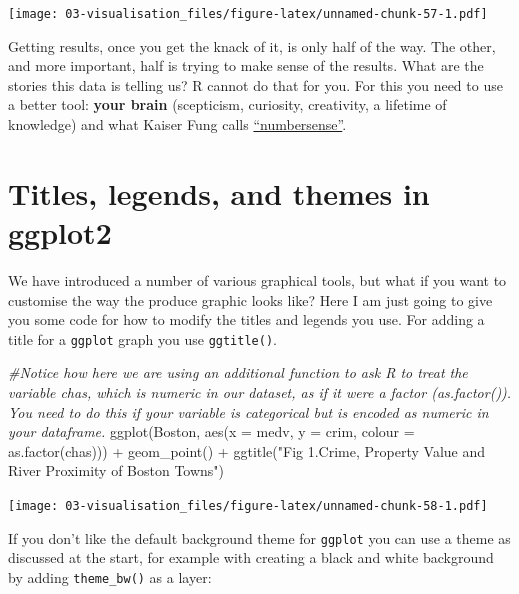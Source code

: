 \documentclass[
]{book}
\newenvironment{Shaded}{\begin{snugshade}}{\end{snugshade}}
\newcommand{\AttributeTok}[1]{\textcolor[rgb]{0.77,0.63,0.00}{#1}}
\newcommand{\CommentTok}[1]{\textcolor[rgb]{0.56,0.35,0.01}{\textit{#1}}}
\newcommand{\FunctionTok}[1]{\textcolor[rgb]{0.00,0.00,0.00}{#1}}
\newcommand{\NormalTok}[1]{#1}
\newcommand{\SpecialCharTok}[1]{\textcolor[rgb]{0.00,0.00,0.00}{#1}}
\newcommand{\StringTok}[1]{\textcolor[rgb]{0.31,0.60,0.02}{#1}}
\begin{document}
\texttt{[image: 03-visualisation\_files/figure-latex/unnamed-chunk-57-1.pdf]}

Getting results, once you get the knack of it, is only half of the way. The other, and more important, half is trying to make sense of the results. What are the stories this data is telling us? R cannot do that for you. For this you need to use a better tool: \textbf{your brain} (scepticism, curiosity, creativity, a lifetime of knowledge) and what Kaiser Fung calls \href{http://www.amazon.co.uk/Numbersense-How-Data-Your-Advantage/dp/0071799664}{``numbersense''}.

\hypertarget{titles-legends-and-themes-in-ggplot2}{%
\section{Titles, legends, and themes in ggplot2}\label{titles-legends-and-themes-in-ggplot2}}

We have introduced a number of various graphical tools, but what if you want to customise the way the produce graphic looks like? Here I am just going to give you some code for how to modify the titles and legends you use. For adding a title for a \texttt{ggplot} graph you use \texttt{ggtitle()}.

\begin{Shaded}
\begin{Highlighting}[]
\CommentTok{\#Notice how here we are using an additional function to ask R to treat the variable chas, which is numeric in our dataset, as if it were a factor (as.factor()). You need to do this if your variable is categorical but is encoded as numeric in your dataframe.}
\FunctionTok{ggplot}\NormalTok{(Boston, }\FunctionTok{aes}\NormalTok{(}\AttributeTok{x =}\NormalTok{ medv, }\AttributeTok{y =}\NormalTok{ crim, }\AttributeTok{colour =} \FunctionTok{as.factor}\NormalTok{(chas))) }\SpecialCharTok{+}
  \FunctionTok{geom\_point}\NormalTok{() }\SpecialCharTok{+}
  \FunctionTok{ggtitle}\NormalTok{(}\StringTok{"Fig 1.Crime, Property Value and River Proximity of Boston Towns"}\NormalTok{)}
\end{Highlighting}
\end{Shaded}

\texttt{[image: 03-visualisation\_files/figure-latex/unnamed-chunk-58-1.pdf]}

If you don't like the default background theme for \texttt{ggplot} you can use a theme as discussed at the start, for example with creating a black and white background by adding \texttt{theme\_bw()} as a layer:
\end{document}
